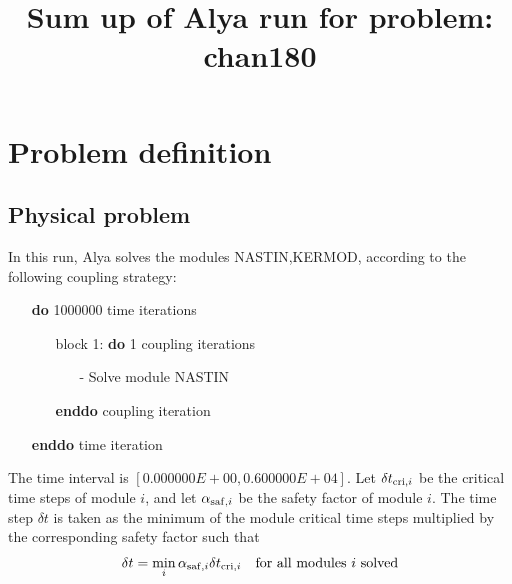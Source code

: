 \documentclass[10pt]{article}
\begin{document}
\title{Sum up of Alya run for problem: chan180}
\maketitle
\section{Problem definition}
\subsection{Physical problem}
In this run, Alya solves the modules NASTIN,KERMOD,
according to the following coupling strategy:
\begin{itemize}
  \item[] {\bf do}      1000000 time iterations 
  \begin{itemize}
\item[] block 1: {\bf do}   1 coupling iterations
\begin{itemize}
  \item[-] Solve module NASTIN
\end{itemize}
\item[] {\bf enddo} coupling iteration
  \end{itemize}
\item[] {\bf enddo} time iteration
\end{itemize}
The time interval is $[
0.000000E+00
,
0.600000E+04
]$.
Let $\delta t_{{\rm cri},i}$ be the critical time steps of module $i$,
and let $\alpha_{{\rm saf},i}$ be the safety factor of module $i$.
The time step $\delta t$ is taken as the minimum of the module critical time steps
multiplied by the corresponding safety factor such that
\begin{eqnarray*}
\delta t = \min_{i} \alpha_{{\rm saf},i} \delta t_{{\rm cri},i}
\quad \mbox{for all modules $i$ solved}
\end{eqnarray*}
\end{document}
